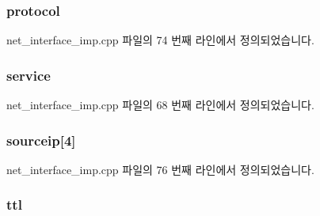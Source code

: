 \subsubsection[{\texorpdfstring{protocol}{protocol}}]{ protocol}\hypertarget{structavdecc__lib_1_1ipheader_ad124d3d2e02c729afa303c775295278e}{}\label{structavdecc__lib_1_1ipheader_ad124d3d2e02c729afa303c775295278e}


net\+\_\+interface\+\_\+imp.\+cpp 파일의 74 번째 라인에서 정의되었습니다.

\subsubsection[{\texorpdfstring{service}{service}}]{ service}\hypertarget{structavdecc__lib_1_1ipheader_a5856d73dde84d68d563f8a4f4858499f}{}\label{structavdecc__lib_1_1ipheader_a5856d73dde84d68d563f8a4f4858499f}


net\+\_\+interface\+\_\+imp.\+cpp 파일의 68 번째 라인에서 정의되었습니다.

\subsubsection[{\texorpdfstring{sourceip}{sourceip}}]{ sourceip\mbox{[}4\mbox{]}}\hypertarget{structavdecc__lib_1_1ipheader_a5bcf609b414bb7fbe6c64aaf33c4c2fc}{}\label{structavdecc__lib_1_1ipheader_a5bcf609b414bb7fbe6c64aaf33c4c2fc}


net\+\_\+interface\+\_\+imp.\+cpp 파일의 76 번째 라인에서 정의되었습니다.

\subsubsection[{\texorpdfstring{ttl}{ttl}}]{ ttl}\hypertarget{structavdecc__lib_1_1ipheader_a4d402503271315376ddf4e47674d4965}{}\label{structavdecc__lib_1_1ipheader_a4d402503271315376ddf4e47674d4965}


